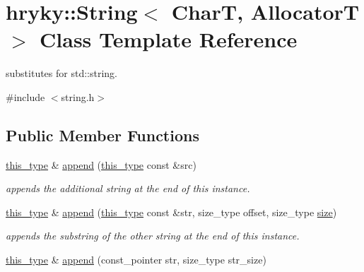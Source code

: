 \hypertarget{classhryky_1_1_string}{\section{hryky\-:\-:String$<$ Char\-T, Allocator\-T $>$ Class Template Reference}
\label{classhryky_1_1_string}
}


substitutes for std\-::string.  




{\ttfamily \#include $<$string.\-h$>$}

\subsection*{Public Member Functions}
\begin{DoxyCompactItemize}
\item 
\hypertarget{classhryky_1_1_string_a7b717e6b7a107d6fdc7c0371fa71fcb8}{\hyperlink{classhryky_1_1_string}{this\-\_\-type} \& \hyperlink{classhryky_1_1_string_a7b717e6b7a107d6fdc7c0371fa71fcb8}{append} (\hyperlink{classhryky_1_1_string}{this\-\_\-type} const \&src)}\label{classhryky_1_1_string_a7b717e6b7a107d6fdc7c0371fa71fcb8}

\begin{DoxyCompactList}\small\item\em appends the additional string at the end of this instance. \end{DoxyCompactList}\item 
\hypertarget{classhryky_1_1_string_a79e1ddcf05952e24719cab2213f5a9a2}{\hyperlink{classhryky_1_1_string}{this\-\_\-type} \& \hyperlink{classhryky_1_1_string_a79e1ddcf05952e24719cab2213f5a9a2}{append} (\hyperlink{classhryky_1_1_string}{this\-\_\-type} const \&str, size\-\_\-type offset, size\-\_\-type \hyperlink{classhryky_1_1_string_a9db0f71dce7b2de86a54ab5323759265}{size})}\label{classhryky_1_1_string_a79e1ddcf05952e24719cab2213f5a9a2}

\begin{DoxyCompactList}\small\item\em appends the substring of the other string at the end of this instance. \end{DoxyCompactList}\item 
\hypertarget{classhryky_1_1_string_a615f5e44a0d32341b0e94147a3a1c8a9}{\hyperlink{classhryky_1_1_string}{this\-\_\-type} \& \hyperlink{classhryky_1_1_string_a615f5e44a0d32341b0e94147a3a1c8a9}{append} (const\-\_\-pointer str, size\-\_\-type str\-\_\-size)}\label{classhryky_1_1_string_a615f5e44a0d32341b0e94147a3a1c8a9}


\end{DoxyCompactItemize}
